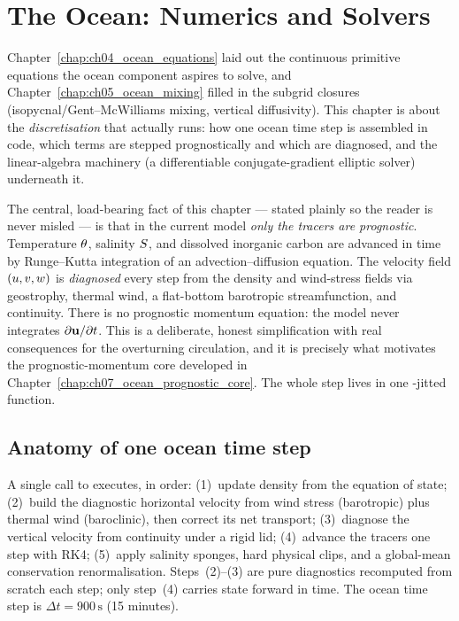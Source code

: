 \chapter{The Ocean: Numerics and Solvers}\label{chap:ch06_ocean_numerics}

\providecommand{\rdrag}{r}              %
\providecommand{\Hcol}{H_{\mathrm{col}}} %
\providecommand{\softp}{\operatorname{softplus}}

Chapter~\ref{chap:ch04_ocean_equations} laid out the continuous primitive
equations the ocean component aspires to solve, and Chapter~\ref{chap:ch05_ocean_mixing}
filled in the subgrid closures (isopycnal/Gent--McWilliams mixing, vertical
diffusivity). This chapter is about the \emph{discretisation} that actually runs:
how one ocean time step is assembled in code, which terms are stepped
prognostically and which are diagnosed, and the linear-algebra machinery (a
differentiable conjugate-gradient elliptic solver) underneath it.

The central, load-bearing fact of this chapter --- stated plainly so the reader is
never misled --- is that in the current model \emph{only the tracers are
prognostic}. Temperature $\theta$, salinity $S$, and dissolved inorganic carbon
are advanced in time by Runge--Kutta integration of an advection--diffusion
equation. The velocity field $(u,v,w)$ is \emph{diagnosed} every step from
the density and wind-stress fields via geostrophy, thermal wind, a flat-bottom
barotropic streamfunction, and continuity. There is no prognostic momentum
equation: the model never integrates $\partial\mathbf{u}/\partial t$. This is a
deliberate, honest simplification with real consequences for the overturning
circulation, and it is precisely what motivates the prognostic-momentum core
developed in Chapter~\ref{chap:ch07_ocean_prognostic_core}. The whole step lives in
one \jax-jitted function.

\section{Anatomy of one ocean time step}

A single call to  executes, in order:
(1)~update density from the equation of state;
(2)~build the diagnostic horizontal velocity from wind stress (barotropic) plus
thermal wind (baroclinic), then correct its net transport;
(3)~diagnose the vertical velocity from continuity under a rigid lid;
(4)~advance the tracers one step with RK4;
(5)~apply salinity sponges, hard physical clips, and a global-mean conservation
renormalisation. Steps~(2)--(3) are pure diagnostics recomputed from scratch each
step; only step~(4) carries state forward in time. The ocean time step is
$\Delta t = 900\,\mathrm{s}$ (15 minutes).

